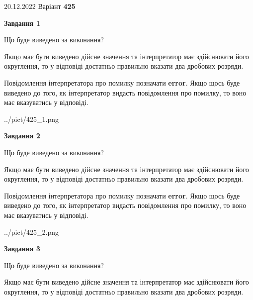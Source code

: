 \documentclass[12pt, ukrainian]{article}
\begin{document}
{20.12.2022 Варіант \No \textbf { 425 }\par}
{
\begin {Large}

{\begin {center}\textbf{Завдання 1}\end {center}}\par
Що буде виведено за виконання? \par

Якщо має бути виведено дійсне значення та інтерпретатор має здійснювати його округлення, 
то у відповіді достатньо правильно вказати два дробових розряди.

Повідомлення інтерпретатора про помилку позначати \textbf{error}.
Якщо щось буде виведено до того, як інтерпретатор видасть повідомлення про помилку, 
то воно має вказуватись у відповіді. \par

\begin{center}
	{../pict/425_1.png}
\end{center}
\newpage

{\begin {center}\textbf{Завдання 2}\end {center}}\par
Що буде виведено за виконання? \par

Якщо має бути виведено дійсне значення та інтерпретатор має здійснювати його округлення, 
то у відповіді достатньо правильно вказати два дробових розряди.

Повідомлення інтерпретатора про помилку позначати \textbf{error}.
Якщо щось буде виведено до того, як інтерпретатор видасть повідомлення про помилку, 
то воно має вказуватись у відповіді. \par

\begin{center}
	{../pict/425_2.png}
\end{center}
\newpage

{\begin {center}\textbf{Завдання 3}\end {center}}\par
Що буде виведено за виконання? \par

Якщо має бути виведено дійсне значення та інтерпретатор має здійснювати його округлення, 
то у відповіді достатньо правильно вказати два дробових розряди.


\end{Large}}
\end{document}
